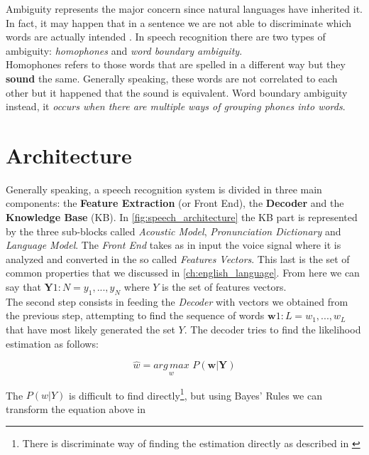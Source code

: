 \noindent Ambiguity represents the major concern since natural languages have inherited it. In fact, it may happen that in a sentence we are not able to discriminate which words are actually intended \cite{forsberg2003speech}. In speech recognition there are two types of ambiguity: \textit{homophones} and \textit{word boundary ambiguity}. \\
Homophones refers to those words that are spelled in a different way but they \textbf{sound} the same. Generally speaking, these words are not correlated to each other but it happened that the sound is equivalent. Word boundary ambiguity instead, it \textit{occurs when there are multiple ways of grouping phones into words}\cite{forsberg2003speech}.

\section{Architecture}
\label{sec:speech_rec_Architecture}
Generally speaking, a speech recognition system is divided in three main components: the \textbf{Feature Extraction} (or Front End), the \textbf{Decoder} and the \textbf{Knowledge Base} (KB). In \ref{fig:speech_architecture} the KB part is represented by the three sub-blocks called \textit{Acoustic Model}, \textit{Pronunciation Dictionary} and \textit{Language Model}. The \textit{Front End} takes as in input the voice signal where it is analyzed and converted in the so called \textit{Features Vectors}. This last is the set of common properties that we discussed in \ref{ch:english_language}. From here we can say that $\textbf{Y} 1:N = y_{1},..., y_{N}$ where $Y$ is the set of features vectors. \\
The second step consists in feeding the \textit{Decoder} with vectors we obtained from the previous step, attempting to find the sequence of words $\textbf{w} 1:L = w_{1}, ... , w_{L}$ that have most likely generated the set $Y$\cite{gales2008application}. The decoder tries to find the likelihood estimation as follows:

\begin{equation}
	\widehat{w} = \underset{w}{arg \, max} \,\, P(\textbf{w}| \textbf{Y})
\end{equation} 

\noindent The $P (w|Y)$ is difficult to find directly\footnote{There is discriminate way of finding the estimation directly as described in \cite{gales2007discriminative}}, but using Bayes' Rules we can transform the equation above in

